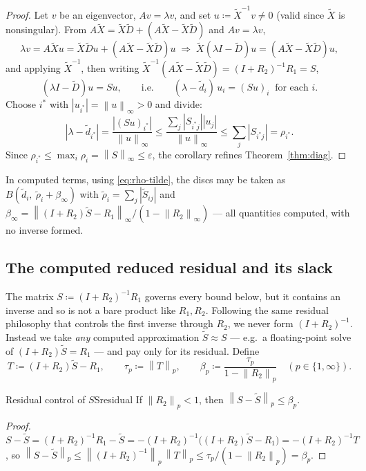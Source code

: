 \documentclass[11pt, a4paper]{article}
\numberwithin{equation}{section}
\newcommand{\norm}[1]{\left\|#1\right\|}
\newcommand{\abs}[1]{\left|#1\right|}
\newcommand{\tX}{\widetilde{X}}
\newcommand{\tD}{\widetilde{D}}
\begin{document}
\begin{proof}
Let $v$ be an eigenvector, $Av = \lambda v$, and set $u \coloneqq \tX^{-1}v \neq
0$ (valid since $\tX$ is nonsingular).  From $A\tX = \tX\tD + (A\tX - \tX\tD)$
and $Av = \lambda v$,
\[
  \lambda v = A\tX u = \tX\tD u + (A\tX - \tX\tD)u
  \;\Longrightarrow\;
  \tX(\lambda I - \tD)u = (A\tX - \tX\tD)u,
\]
and applying $\tX^{-1}$, then writing $\tX^{-1}(A\tX-\tX\tD) = (I+R_2)^{-1}R_1 =
S$,
\[
  (\lambda I - \tD)u = S u,
  \qquad\text{i.e.}\qquad
  (\lambda - \tilde d_i)\,u_i = (Su)_i \ \text{ for each } i.
\]
Choose $i^*$ with $\abs{u_{i^*}} = \norm{u}_\infty > 0$ and divide:
\[
  \abs{\lambda - \tilde d_{i^*}}
    = \frac{\abs{(Su)_{i^*}}}{\norm{u}_\infty}
    \le \frac{\sum_j \abs{S_{i^*j}}\abs{u_j}}{\norm{u}_\infty}
    \le \sum_j \abs{S_{i^*j}} = \rho_{i^*}.
\]
Since $\rho_{i^*} \le \max_i \rho_i = \norm{S}_\infty \le \varepsilon$, the
corollary refines Theorem~\ref{thm:diag}.
\end{proof}

In computed terms, using \eqref{eq:rho-tilde}, the discs may be taken as
$B(\tilde d_i,\ \tilde\rho_i + \beta_\infty)$ with $\tilde\rho_i = \sum_j
\abs{\tilde S_{ij}}$ and $\beta_\infty = \norm{(I+R_2)\tilde S - R_1}_\infty /
(1 - \norm{R_2}_\infty)$ --- all quantities computed, with no inverse formed.

\subsection{The computed reduced residual and its slack}

The matrix $S \coloneqq (I + R_2)^{-1} R_1$ governs every bound below, but it
contains an inverse and so is not a bare product like $R_1, R_2$.  Following the
same residual philosophy that controls the first inverse through $R_2$, we never
form $(I+R_2)^{-1}$.  Instead we take \emph{any} computed approximation $\tilde
S \approx S$ --- e.g.\ a floating-point solve of $(I + R_2)\tilde S = R_1$ ---
and pay only for its residual.  Define
\[
  T \coloneqq (I + R_2)\tilde S - R_1, \qquad
  \tau_p \coloneqq \norm{T}_p, \qquad
  \beta_p \coloneqq \frac{\tau_p}{1 - \norm{R_2}_p} \quad (p \in \{1,\infty\}).
\]

\begin{lemma}{Residual control of $S$}{Sresidual}
  If $\norm{R_2}_p < 1$, then $\norm{S - \tilde S}_p \le \beta_p$.
\end{lemma}

\begin{proof}
$S - \tilde S = (I+R_2)^{-1}R_1 - \tilde S = -(I+R_2)^{-1}\bigl((I+R_2)\tilde S
- R_1\bigr) = -(I+R_2)^{-1}T$, so $\norm{S - \tilde S}_p \le
\norm{(I+R_2)^{-1}}_p\,\norm{T}_p \le \tau_p/(1 - \norm{R_2}_p) = \beta_p$.
\end{proof}
\end{document}
